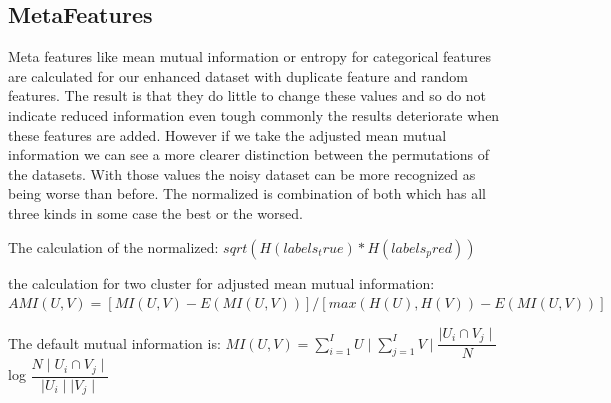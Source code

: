 \documentclass[a4paper,10pt]{article}
\begin{document}
\subsection{MetaFeatures}
Meta features like mean mutual information or entropy for categorical features are calculated for our enhanced dataset with duplicate feature and random features. The result is that they do little to change these values and so do not indicate reduced information even tough commonly the results deteriorate when these features are added. However if we take the adjusted mean mutual information we can see a more clearer distinction between the permutations of the datasets. With those values the noisy dataset can be more recognized as being worse than before. The normalized  is combination of both which has all three kinds in some case the best or the worsed.

The calculation of the normalized:
$sqrt(H(labels_true) * H(labels_pred))$


the calculation for two cluster for adjusted mean mutual information:
$AMI(U, V) = [MI(U, V) - E(MI(U, V))] / [max(H(U), H(V)) - E(MI(U, V))]$


The default mutual information is:
$MI(U,V) = \sum_{i = 1}^{I} U \mid\sum_{j = 1}^{I} V \mid \dfrac{\mid U_i \cap V_j\mid}{N} $log $\dfrac{N\mid U_i \cap V_j\mid}{\mid U_i\mid \mid V_j\mid}$
\end{document}
